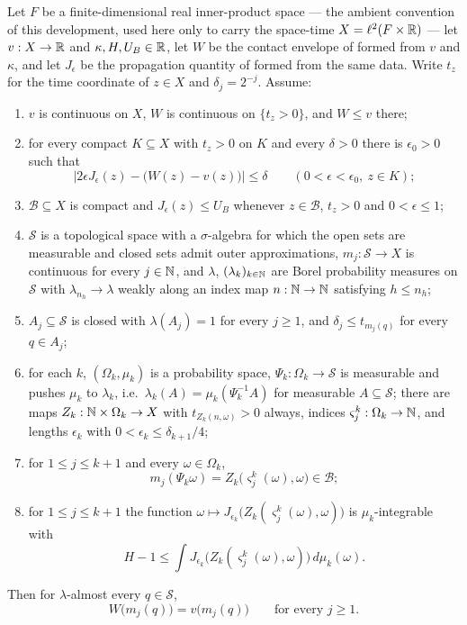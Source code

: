\begin{lemma}
Let $F$ be a finite-dimensional real inner-product space --- the ambient
convention of this development, used here only to carry the space-time
$X=\ell^2(F\times\mathbb{R})$ --- let $v:X\to\mathbb{R}$ and $\kappa,H,U_B\in\mathbb{R}$, let $W$ be
the contact envelope of  formed from $v$ and $\kappa$, and
let $J_\epsilon$ be the propagation quantity of  formed from the
same data. Write $t_z$ for the time coordinate of $z\in X$ and
$\delta_j=2^{-j}$. Assume:
\begin{enumerate}
\item\label{it:calm-v} $v$ is continuous on $X$, $W$ is continuous on
$\{t_z>0\}$, and $W\le v$ there;
\item\label{it:calm-gap} for every compact $K\subseteq X$ with $t_z>0$ on $K$
and every $\delta>0$ there is $\epsilon_0>0$ such that
\[
  \bigl|2\epsilon J_\epsilon(z)-\bigl(W(z)-v(z)\bigr)\bigr|\le\delta
  \qquad(0<\epsilon<\epsilon_0,\ z\in K);
\]
\item\label{it:calm-box} $\mathcal B\subseteq X$ is compact and
$J_\epsilon(z)\le U_B$ whenever $z\in\mathcal B$, $t_z>0$ and
$0<\epsilon\le1$;
\item\label{it:calm-space} $\mathcal S$ is a topological space with a
$\sigma$-algebra for which the open sets are measurable and closed sets admit
outer approximations, $m_j:\mathcal S\to X$ is continuous for every $j\in\mathbb{N}$,
and $\lambda$, $(\lambda_k)_{k\in\mathbb{N}}$ are Borel probability measures on
$\mathcal S$ with $\lambda_{n_h}\to\lambda$ weakly along an index map
$n:\mathbb{N}\to\mathbb{N}$ satisfying $h\le n_h$;
\item\label{it:calm-A} $A_j\subseteq\mathcal S$ is closed with
$\lambda(A_j)=1$ for every $j\ge1$, and $\delta_j\le t_{m_j(q)}$ for every
$q\in A_j$;
\item\label{it:calm-walk} for each $k$, $(\Omega_k,\mu_k)$ is a probability
space, $\Psi_k:\Omega_k\to\mathcal S$ is measurable and pushes $\mu_k$ to
$\lambda_k$, i.e.\ $\lambda_k(A)=\mu_k(\Psi_k^{-1}A)$ for measurable
$A\subseteq\mathcal S$; there are maps $Z_k:\mathbb{N}\times\Omega_k\to X$ with
$t_{Z_k(n,\omega)}>0$ always, indices
$\varsigma^k_j:\Omega_k\to\mathbb{N}$, and lengths $\epsilon_k$ with
$0<\epsilon_k\le\delta_{k+1}/4$;
\item\label{it:calm-mark} for $1\le j\le k+1$ and every $\omega\in\Omega_k$,
\[
  m_j(\Psi_k\omega)=Z_k\bigl(\varsigma^k_j(\omega),\omega\bigr)
  \in\mathcal B ;
\]
\item\label{it:calm-mean} for $1\le j\le k+1$ the function
$\omega\mapsto J_{\epsilon_k}\bigl(Z_k(\varsigma^k_j(\omega),\omega)\bigr)$ is
$\mu_k$-integrable with
\[
  H-1\le\int J_{\epsilon_k}
    \bigl(Z_k(\varsigma^k_j(\omega),\omega)\bigr)\,d\mu_k(\omega).
\]
\end{enumerate}
Then for $\lambda$-almost every $q\in\mathcal S$,
\[
  W\bigl(m_j(q)\bigr)=v\bigl(m_j(q)\bigr)\qquad\text{for every }j\ge1 .
\]
\end{lemma}

